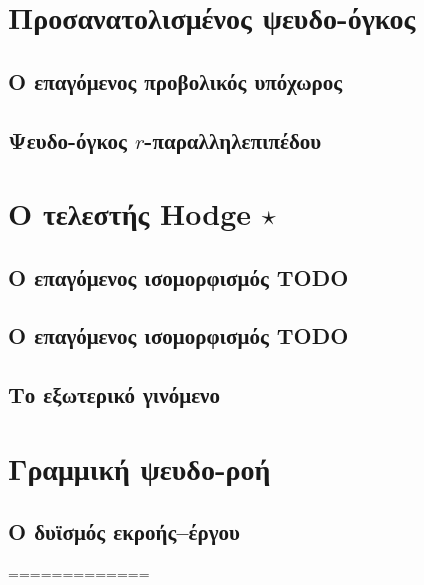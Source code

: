 \documentclass[11pt,a4paper,twoside,openright]{book}
\begin{document}
\section{Προσανατολισμένος ψευδο-όγκος}

\subsection{O επαγόμενος προβολικός υπόχωρος}

\subsection{Ψευδο-όγκος $r$-παραλληλεπιπέδου}

\section{O τελεστής Hodge $\star$}

\subsection{Ο επαγόμενος ισομορφισμός TODO}

\subsection{Ο επαγόμενος ισομορφισμός TODO}

\subsection{Το εξωτερικό γινόμενο}

\section{Γραμμική ψευδο-ροή}

\subsection{Ο δυϊσμός εκροής--έργου}

=============
\end{document}
